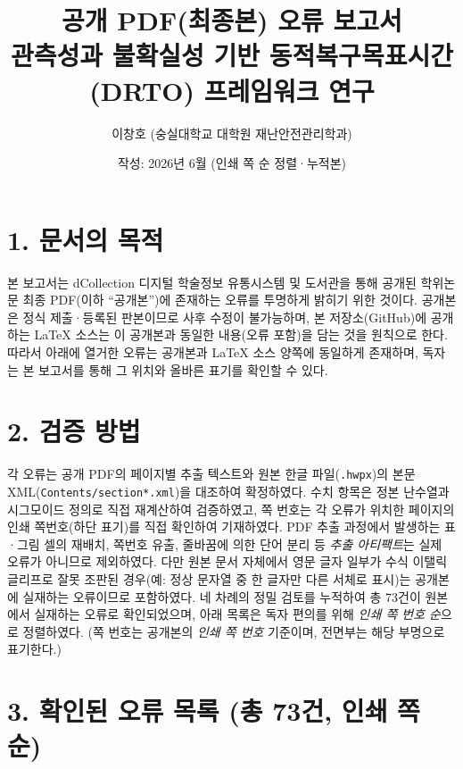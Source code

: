 \documentclass[11pt,a4paper]{article}
\title{\textbf{공개 PDF(최종본) 오류 보고서}\\[4pt]
\large 관측성과 불확실성 기반 동적복구목표시간(DRTO) 프레임워크 연구}
\author{이창호 (숭실대학교 대학원 재난안전관리학과)}
\date{작성: 2026년 6월 (인쇄 쪽 순 정렬·누적본)}
\begin{document}
\maketitle

\section*{1. 문서의 목적}

본 보고서는 dCollection 디지털 학술정보 유통시스템 및 도서관을 통해 공개된
학위논문 최종 PDF(이하 ``공개본'')에 존재하는 오류를 투명하게 밝히기 위한 것이다.
공개본은 정식 제출·등록된 판본이므로 사후 수정이 불가능하며, 본 저장소(GitHub)에
공개하는 \LaTeX{} 소스는 이 공개본과 동일한 내용(오류 포함)을 담는 것을 원칙으로 한다.
따라서 아래에 열거한 오류는 공개본과 \LaTeX{} 소스 양쪽에 동일하게 존재하며,
독자는 본 보고서를 통해 그 위치와 올바른 표기를 확인할 수 있다.

\section*{2. 검증 방법}

각 오류는 공개 PDF의 페이지별 추출 텍스트와 원본 한글 파일(\texttt{.hwpx})의
본문 XML(\texttt{Contents/section*.xml})을 대조하여 확정하였다. 수치 항목은 정본
난수열과 시그모이드 정의로 직접 재계산하여 검증하였고, 쪽 번호는 각 오류가 위치한
페이지의 인쇄 쪽번호(하단 표기)를 직접 확인하여 기재하였다.
PDF 추출 과정에서 발생하는 표·그림 셀의 재배치, 쪽번호 유출, 줄바꿈에 의한 단어 분리
등 \emph{추출 아티팩트}는 실제 오류가 아니므로 제외하였다.
다만 원본 문서 자체에서 영문 글자 일부가 수식 이탤릭 글리프로 잘못 조판된 경우(예: 정상
문자열 중 한 글자만 다른 서체로 표시)는 공개본에 실재하는 오류이므로 포함하였다.
네 차례의 정밀 검토를 누적하여 총 73건이 원본에서 실재하는 오류로 확인되었으며, 아래
목록은 독자 편의를 위해 \emph{인쇄 쪽 번호 순}으로 정렬하였다.
(쪽 번호는 공개본의 \emph{인쇄 쪽 번호} 기준이며, 전면부는 해당 부명으로 표기한다.)

\section*{3. 확인된 오류 목록 (총 73건, 인쇄 쪽 순)}
\end{document}
